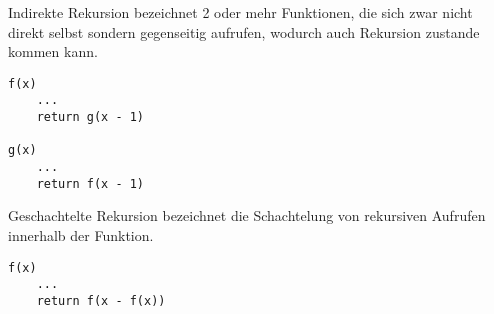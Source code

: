Indirekte Rekursion bezeichnet 2 oder mehr Funktionen, die sich zwar
nicht direkt selbst sondern gegenseitig aufrufen, wodurch auch Rekursion
zustande kommen kann.

\begin{lstlisting}
f(x)
    ...
    return g(x - 1)

g(x)
    ...
    return f(x - 1)
\end{lstlisting}

Geschachtelte Rekursion bezeichnet die Schachtelung von rekursiven Aufrufen
innerhalb der Funktion.

\begin{lstlisting}
f(x)
    ...
    return f(x - f(x))
\end{lstlisting}

